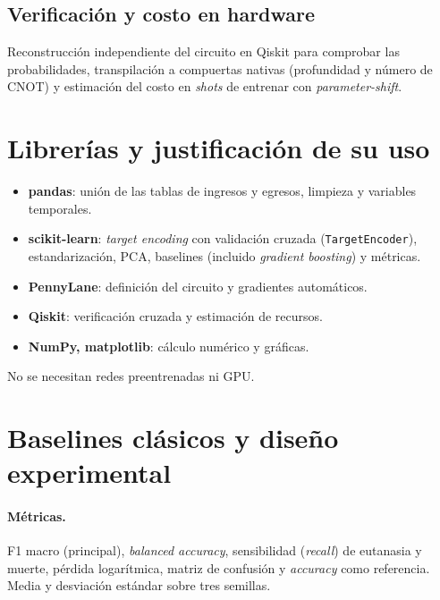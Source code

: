 \documentclass[11pt,letterpaper]{article}
\begin{document}
\subsection{Verificación y costo en hardware}
Reconstrucción independiente del circuito en Qiskit para comprobar las probabilidades,
transpilación a compuertas nativas (profundidad y número de CNOT) y estimación del costo en
\emph{shots} de entrenar con \emph{parameter-shift}.

\section{Librerías y justificación de su uso}
\begin{itemize}[leftmargin=*]
\item \textbf{pandas}: unión de las tablas de ingresos y egresos, limpieza y variables temporales.
\item \textbf{scikit-learn}: \emph{target encoding} con validación cruzada (\texttt{TargetEncoder}),
estandarización, PCA, baselines (incluido \emph{gradient boosting}) y métricas.
\item \textbf{PennyLane}: definición del circuito y gradientes automáticos.
\item \textbf{Qiskit}: verificación cruzada y estimación de recursos.
\item \textbf{NumPy, matplotlib}: cálculo numérico y gráficas.
\end{itemize}
No se necesitan redes preentrenadas ni GPU.

\section{Baselines clásicos y diseño experimental}
\paragraph{Métricas.} F1 macro (principal), \emph{balanced accuracy}, sensibilidad (\emph{recall}) de
eutanasia y muerte, pérdida logarítmica, matriz de confusión y \emph{accuracy} como referencia. Media
y desviación estándar sobre tres semillas.
\end{document}
